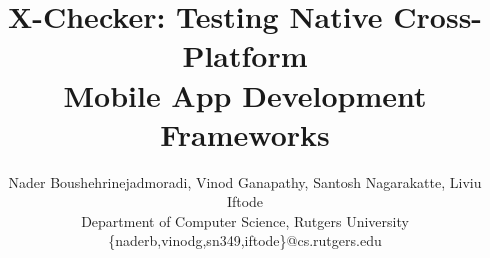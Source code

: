 \documentclass{sig-alternate}
\newcommand{\tool}{X-Checker}
\begin{document}
\title{\tool: Testing Native Cross-Platform\\Mobile App Development Frameworks}
\author{
Nader Boushehrinejadmoradi, Vinod Ganapathy, Santosh Nagarakatte, Liviu Iftode\\
\affaddr Department of Computer Science, Rutgers University\\
\email \{naderb,vinodg,sn349,iftode\}@cs.rutgers.edu
}
\date{}

\maketitle
\begin{abstract}
%

%
\end{abstract}















\begin{center}
\end{center}
\end{document}
